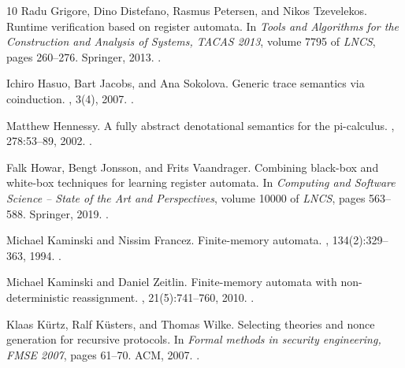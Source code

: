 \documentclass[11pt,a4paper]{amsart}
\theoremstyle{plain}
\numberwithin{equation}{section}
\newcommand{\+}[1]{\mathcal{#1}\xspace}
\theoremstyle{definition}
\begin{document}
\begin{thebibliography}{10}
Radu Grigore, Dino Distefano, Rasmus Petersen, and Nikos Tzevelekos.
\newblock Runtime verification based on register automata.
\newblock In {\em Tools and Algorithms for the Construction and Analysis of
  Systems, {TACAS} 2013}, volume 7795 of {\em LNCS}, pages 260--276. Springer,
  2013.
\newblock \href {https://doi.org/10.1007/978-3-642-36742-7_19}
  {}.

Ichiro Hasuo, Bart Jacobs, and Ana Sokolova.
\newblock Generic trace semantics via coinduction.
, 3(4), 2007.
\newblock \href {https://doi.org/10.2168/LMCS-3(4:11)2007}
  {}.

Matthew Hennessy.
\newblock A fully abstract denotational semantics for the pi-calculus.
, 278:53--89, 2002.
\newblock \href {https://doi.org/10.1016/S0304-3975(00)00331-5}
  {}.

Falk Howar, Bengt Jonsson, and Frits Vaandrager.
\newblock Combining black-box and white-box techniques for learning register
  automata.
\newblock In {\em Computing and Software Science -- State of the Art and
  Perspectives}, volume 10000 of {\em LNCS}, pages 563--588. Springer, 2019.
\newblock \href {https://doi.org/10.1007/978-3-319-91908-9_26}
  {}.

Michael Kaminski and Nissim Francez.
\newblock Finite-memory automata.
, 134(2):329--363, 1994.
\newblock \href {https://doi.org/10.1016/0304-3975(94)90242-9}
  {}.

Michael Kaminski and Daniel Zeitlin.
\newblock Finite-memory automata with non-deterministic reassignment.
, 21(5):741--760, 2010.
\newblock \href {https://doi.org/10.1142/S0129054110007532}
  {}.

Klaas K{\"{u}}rtz, Ralf K{\"{u}}sters, and Thomas Wilke.
\newblock Selecting theories and nonce generation for recursive protocols.
\newblock In {\em Formal methods in security engineering, {FMSE} 2007}, pages
  61--70. {ACM}, 2007.
\newblock \href {https://doi.org/10.1145/1314436.1314445}
  {}.


\end{thebibliography}
\end{document}
